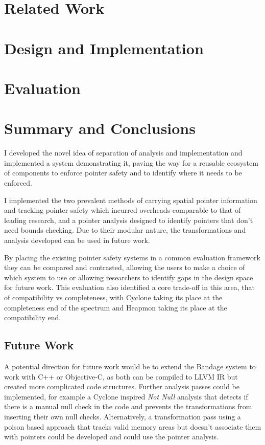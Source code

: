 \documentclass[a4paper,12pt,twoside,openright]{report}
\begin{document}
\chapter{Related Work} 


\chapter{Design and Implementation} 


\chapter{Evaluation} 


\chapter{Summary and Conclusions} 

I developed the novel idea of separation of analysis and implementation and implemented a system demonstrating it, paving the way for a reusable ecosystem of components to enforce pointer safety and to identify where it needs to be enforced.

I implemented the two prevalent methods of carrying spatial pointer information and tracking pointer safety which incurred overheads comparable to that of leading research, and a pointer analysis designed to identify pointers that don't need bounds checking.
Due to their modular nature, the transformations and analysis developed can be used in future work.

By placing the existing pointer safety systems in a common evaluation framework they can be compared and contrasted, allowing the users to make a choice of which system to use or allowing researchers to identify gaps in the design space for future work.
This evaluation also identified a core trade-off in this area, that of compatibility vs completeness, with Cyclone taking its place at the completeness end of the spectrum and Heapmon taking its place at the compatibility end.

\section{Future Work}

A potential direction for future work would be to extend the Bandage system to work with C++ or Objective-C, as both can be compiled to LLVM IR but created more complicated code structures.
Further analysis passes could be implemented, for example a Cyclone inspired \textit{Not Null} analysis that detects if there is a manual null check in the code and prevents the transformations from inserting their own null checks.
Alternatively, a transformation pass using a poison based approach that tracks valid memory areas but doesn't associate them with pointers could be developed and could use the pointer analysis.

\appendix
\singlespacing

 
 
\end{document}
